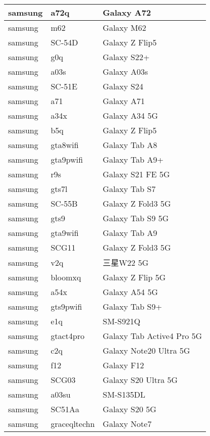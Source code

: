 \begin{tabularx}{\linewidth}{|l|X|X|}
        samsung & a72q & Galaxy A72 \\ \hline
        samsung & m62 & Galaxy M62 \\ \hline
        samsung & SC-54D & Galaxy Z Flip5 \\ \hline
        samsung & g0q & Galaxy S22+ \\ \hline
        samsung & a03s & Galaxy A03s \\ \hline
        samsung & SC-51E & Galaxy S24 \\ \hline
        samsung & a71 & Galaxy A71 \\ \hline
        samsung & a34x & Galaxy A34 5G \\ \hline
        samsung & b5q & Galaxy Z Flip5 \\ \hline
        samsung & gta8wifi & Galaxy Tab A8 \\ \hline
        samsung & gta9pwifi & Galaxy Tab A9+ \\ \hline
        samsung & r9s & Galaxy S21 FE 5G \\ \hline
        samsung & gts7l & Galaxy Tab S7 \\ \hline
        samsung & SC-55B & Galaxy Z Fold3 5G \\ \hline
        samsung & gts9 & Galaxy Tab S9 5G \\ \hline
        samsung & gta9wifi & Galaxy Tab A9 \\ \hline
        samsung & SCG11 & Galaxy Z Fold3 5G \\ \hline
        samsung & v2q & 三星W22 5G \\ \hline
        samsung & bloomxq & Galaxy Z Flip 5G \\ \hline
        samsung & a54x & Galaxy A54 5G \\ \hline
        samsung & gts9pwifi & Galaxy Tab S9+ \\ \hline
        samsung & e1q & SM-S921Q \\ \hline
        samsung & gtact4pro & Galaxy Tab Active4 Pro 5G \\ \hline
        samsung & c2q & Galaxy Note20 Ultra 5G \\ \hline
        samsung & f12 & Galaxy F12 \\ \hline
        samsung & SCG03 & Galaxy S20 Ultra 5G \\ \hline
        samsung & a03su & SM-S135DL \\ \hline
        samsung & SC51Aa & Galaxy S20 5G \\ \hline
        samsung & graceqltechn & Galaxy Note7 \\ \hline

\end{tabularx}
